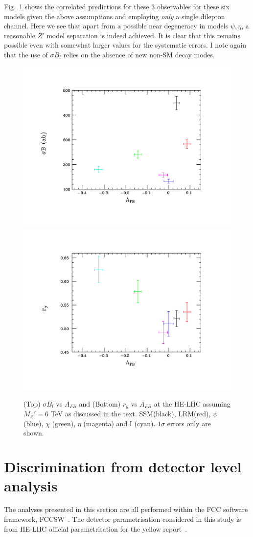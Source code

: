 \documentclass[14pt]{article}
\begin{document}
Fig.~\ref{toy3} shows the correlated predictions for these 3 observables for these six models given the above assumptions and employing {\it only} a single dilepton 
channel. Here we see that apart from a possible near degeneracy in models $\psi,\eta$, a reasonable $Z'$ model separation is indeed achieved. It is clear that this 
remains possible even with somewhat larger values for the systematic errors. I note again that the use of $\sigma B_l$ relies on the absence of new non-SM decay 
modes.



\begin{figure}[htbp]
  \centering
\includegraphics[trim={2cm 2cm 2cm 2cm},clip,width=0.49\columnwidth]{figures/compare2.pdf}
\includegraphics[trim={2cm 2cm 2cm 2cm},clip,width=0.49\columnwidth]{figures/compare3.pdf}
\caption{(Top) $\sigma B_l$ vs $A_{FB}$ and (Bottom) $r_y$ vs $A_{FB}$ at the HE-LHC assuming $M_Z'=6$ TeV as discussed in the text. 
SSM(black), LRM(red), $\psi$ (blue), $\chi$ (green), $\eta$ (magenta) and I (cyan). $1\sigma$ errors only are shown. }
\label{toy3}
\end{figure}




\section{Discrimination from detector level analysis}
The analyses presented in this section are all performed within the FCC software framework, FCCSW~\cite{fccsw}.
The detector parametrisation considered in this study is from HE-LHC official parametrisation for the yellow report~\cite{HELHCtwiki}.
\end{document}
